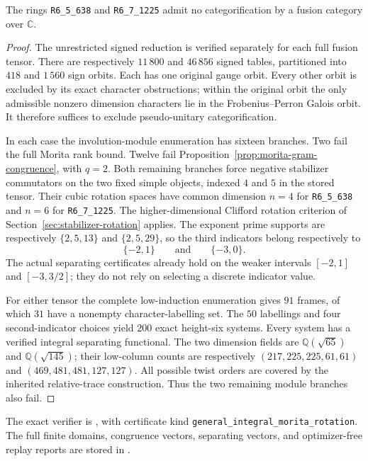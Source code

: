 \begin{proposition}\label{prop:round3-higher-stabilizer}
The rings \texttt{R6\_5\_638} and \texttt{R6\_7\_1225} admit no
categorification by a fusion category over $\mathbb C$.
\end{proposition}
\begin{proof}
The unrestricted signed reduction is verified separately for each full
fusion tensor. There are respectively $11\,800$ and $46\,856$ signed
tables, partitioned into $418$ and $1\,560$ sign orbits. Each has one
original gauge orbit. Every other orbit is excluded by its exact
character obstructions; within the original orbit the only admissible
nonzero dimension characters lie in the Frobenius--Perron Galois orbit.
It therefore suffices to exclude pseudo-unitary categorification.

In each case the involution-module enumeration has sixteen branches.
Two fail the full Morita rank bound. Twelve fail
Proposition~\ref{prop:morita-gram-congruence}, with $q=2$. Both remaining
branches force negative stabilizer commutators on the two fixed simple
objects, indexed $4$ and $5$ in the stored tensor. Their cubic rotation
spaces have common dimension $n=4$ for \texttt{R6\_5\_638} and $n=6$
for \texttt{R6\_7\_1225}. The higher-dimensional Clifford rotation
criterion of Section~\ref{sec:stabilizer-rotation} applies. The exponent
prime supports are respectively $\{2,5,13\}$ and $\{2,5,29\}$, so the
third indicators belong respectively to
\[
 \{-2,1\}\qquad\text{and}\qquad\{-3,0\}.
\]
The actual separating certificates already hold on the weaker intervals
$[-2,1]$ and $[-3,3/2]$; they do not rely on selecting a discrete indicator
value.

For either tensor the complete low-induction enumeration gives $91$
frames, of which $31$ have a nonempty character-labelling set. The $50$
labellings and four second-indicator choices yield $200$ exact
height-six systems. Every system has a verified integral separating
functional. The two dimension fields are $\mathbb Q(\sqrt{65})$ and
$\mathbb Q(\sqrt{145})$; their low-column counts are respectively
$(217,225,225,61,61)$ and $(469,481,481,127,127)$. All possible twist
orders are covered by the inherited relative-trace construction.
Thus the two remaining module branches also fail.
\end{proof}

The exact verifier is
, with certificate kind
\texttt{general\_integral\_morita\_rotation}. The full finite domains,
congruence vectors, separating vectors, and optimizer-free replay reports
are stored in .
